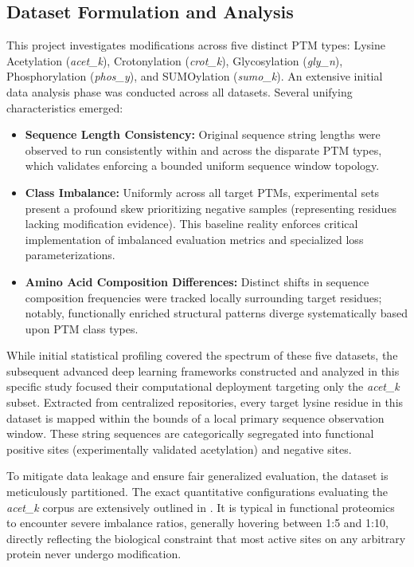\documentclass[conference]{IEEEtran}
\begin{document}
\subsection{Dataset Formulation and Analysis}
This project investigates modifications across five distinct PTM types: Lysine Acetylation (\textit{acet\_k}), Crotonylation (\textit{crot\_k}), Glycosylation (\textit{gly\_n}), Phosphorylation (\textit{phos\_y}), and SUMOylation (\textit{sumo\_k}). An extensive initial data analysis phase was conducted across all datasets. Several unifying characteristics emerged:
\begin{itemize}
    \item \textbf{Sequence Length Consistency:} Original sequence string lengths were observed to run consistently within and across the disparate PTM types, which validates enforcing a bounded uniform sequence window topology.
    \item \textbf{Class Imbalance:} Uniformly across all target PTMs, experimental sets present a profound skew prioritizing negative samples (representing residues lacking modification evidence). This baseline reality enforces critical implementation of imbalanced evaluation metrics and specialized loss parameterizations.
    \item \textbf{Amino Acid Composition Differences:} Distinct shifts in sequence composition frequencies were tracked locally surrounding target residues; notably, functionally enriched structural patterns diverge systematically based upon PTM class types.
\end{itemize}

While initial statistical profiling covered the spectrum of these five datasets, the subsequent advanced deep learning frameworks constructed and analyzed in this specific study focused their computational deployment targeting only the \textit{acet\_k} subset. Extracted from centralized repositories, every target lysine residue in this dataset is mapped within the bounds of a local primary sequence observation window. These string sequences are categorically segregated into functional positive sites (experimentally validated acetylation) and negative sites.

To mitigate data leakage and ensure fair generalized evaluation, the dataset is meticulously partitioned. The exact quantitative configurations evaluating the \textit{acet\_k} corpus are extensively outlined in . It is typical in functional proteomics to encounter severe imbalance ratios, generally hovering between 1:5 and 1:10, directly reflecting the biological constraint that most active sites on any arbitrary protein never undergo modification.
\end{document}
